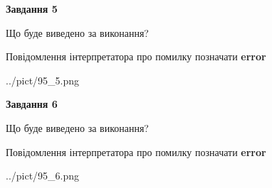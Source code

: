 \documentclass[12pt, ukrainian]{article}
\begin{document}
{{\begin {center}\textbf{Завдання 5}\end {center}}\par
Що буде виведено за виконання? \par
Повідомлення інтерпретатора про помилку позначати \textbf{error}

\begin{center}
	{../pict/95_5.png}
\end{center}
\newpage

{\begin {center}\textbf{Завдання 6}\end {center}}\par
Що буде виведено за виконання? \par
Повідомлення інтерпретатора про помилку позначати \textbf{error}

\begin{center}
	{../pict/95_6.png}
\end{center}
\newpage

}
\end{document}
